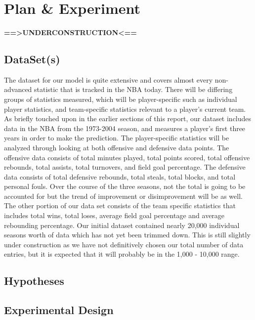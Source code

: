 \documentclass{article}
\begin{document}
\section{Plan \& Experiment}
\paragraph{==>UNDERCONSTRUCTION<==}

\subsection{DataSet(s)}
The dataset for our model is quite extensive and covers almost every non-advanced statistic that is tracked in the NBA today. There will be differing groups of statistics measured, which will be player-specific such as individual player statistics, and team-specific statistics relevant to a player's current team. As briefly touched upon in the earlier sections of this report, our dataset includes data in the NBA from the 1973-2004 season, and measures a player's first three years in order to make the prediction. 
The player-specific statistics will be analyzed through looking at both offensive and defensive data points. The offensive data consists of total minutes played, total points scored, total offensive rebounds, total assists, total turnovers, and field goal percentage. The defensive data consists of total defensive rebounds, total steals, total blocks, and total personal fouls. Over the course of the three seasons, not the total is going to be accounted for but the trend of improvement or disimprovement will be as well.  The other portion of our data set consists of the team specific statistics that includes total wins, total loses, average field goal percentage and average rebounding percentage. 
Our initial dataset contained nearly 20,000 individual seasons worth of data which has not yet been trimmed down. This is still slightly under construction as we have not definitively chosen our total number of data entries, but it is expected that it will probably be in the 1,000 - 10,000 range.


\subsection{Hypotheses}

\subsection{Experimental Design}
\end{document}
